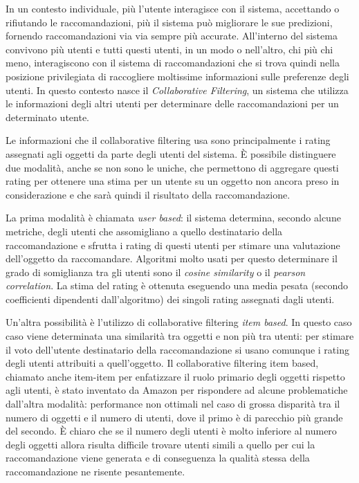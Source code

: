 \documentclass[letterpaper]{article}
\begin{document}
In un contesto individuale, più l'utente interagisce con il sistema, accettando o rifiutando le raccomandazioni, più il sistema può migliorare le sue predizioni, fornendo raccomandazioni via via sempre più accurate. All'interno del sistema convivono più utenti e tutti questi utenti, in un modo o nell'altro, chi più chi meno, interagiscono con il sistema di raccomandazioni che si trova quindi nella posizione privilegiata di raccogliere moltissime informazioni sulle preferenze degli utenti. In questo contesto nasce il \emph{Collaborative Filtering}, un sistema che utilizza le informazioni degli altri utenti per determinare delle raccomandazioni per un determinato utente.

Le informazioni che il collaborative filtering usa sono principalmente i rating assegnati agli oggetti da parte degli utenti del sistema. \`E possibile distinguere due modalità, anche se non sono le uniche, che permettono di aggregare questi rating per ottenere una stima per un utente su un oggetto non ancora preso in considerazione e che sarà quindi il risultato della raccomandazione.

La prima modalità è chiamata \emph{user based}: il sistema determina, secondo alcune metriche, degli utenti che assomigliano a quello destinatario della raccomandazione e sfrutta i rating di questi utenti per stimare una valutazione dell'oggetto da raccomandare. Algoritmi molto usati per questo determinare il grado di somiglianza tra gli utenti sono il \emph{cosine similarity} o il \emph{pearson correlation}. La stima del rating è ottenuta eseguendo una media pesata (secondo coefficienti dipendenti dall'algoritmo) dei singoli rating assegnati dagli utenti.

Un'altra possibilità è l'utilizzo di collaborative filtering \emph{item based}. In questo caso caso viene determinata una similarità tra oggetti e non più tra utenti: per stimare il voto dell'utente destinatario della raccomandazione si usano comunque i rating degli utenti attribuiti a quell'oggetto. Il collaborative filtering item based, chiamato anche item-item per enfatizzare il ruolo primario degli oggetti rispetto agli utenti, è stato inventato da Amazon per rispondere ad alcune problematiche dall'altra modalità: performance non ottimali nel caso di grossa disparità tra il numero di oggetti e il numero di utenti, dove il primo è di parecchio più grande del secondo. \`E chiaro che se il numero degli utenti è molto inferiore al numero degli oggetti allora risulta difficile trovare utenti simili a quello per cui la raccomandazione viene generata e di conseguenza la qualità stessa della raccomandazione ne risente pesantemente.
\end{document}
